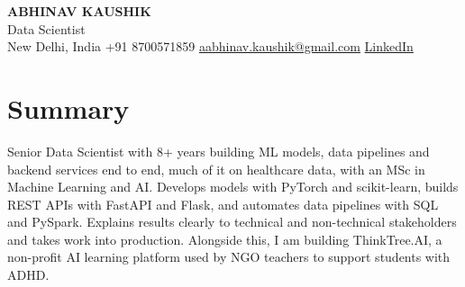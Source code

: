 \documentclass[10pt,a4paper]{article}
\begin{document}
\begin{center}
  {\LARGE\bfseries ABHINAV KAUSHIK}\\[2pt]
  {\large Data Scientist}\\[2pt]
  New Delhi, India \textbar{} +91 8700571859 \textbar{} \href{mailto:aabhinav.kaushik@gmail.com}{aabhinav.kaushik@gmail.com} \textbar{} \href{https://www.linkedin.com/in/abhinav-kaushik10/}{LinkedIn}  
\end{center}

\section{Summary}
Senior Data Scientist with 8+ years building ML models, data pipelines and backend services end to end, much of it on healthcare data, with an MSc in Machine Learning and AI. Develops models with PyTorch and scikit-learn, builds REST APIs with FastAPI and Flask, and automates data pipelines with SQL and PySpark. Explains results clearly to technical and non-technical stakeholders and takes work into production. Alongside this, I am building ThinkTree.AI, a non-profit AI learning platform used by NGO teachers to support students with ADHD.
\end{document}
